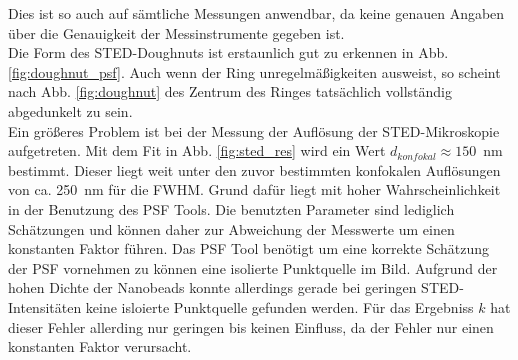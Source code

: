Dies ist so auch auf sämtliche Messungen anwendbar, da keine genauen Angaben über die Genauigkeit der Messinstrumente gegeben ist.
\\
Die Form des STED-Doughnuts ist erstaunlich gut zu erkennen in Abb. \ref{fig:doughnut_psf}. Auch wenn der Ring unregelmäßigkeiten ausweist, so scheint nach Abb. \ref{fig:doughnut} des Zentrum des Ringes tatsächlich vollständig abgedunkelt zu sein.
\\
Ein größeres Problem ist bei der Messung der Auflösung der STED-Mikroskopie aufgetreten. Mit dem Fit in Abb. \ref{fig:sted_res} wird ein Wert $d_{konfokal} \approx 150$~nm bestimmt.
Dieser liegt weit unter den zuvor bestimmten konfokalen Auflösungen von ca. 250~nm für die FWHM.
Grund dafür liegt mit hoher Wahrscheinlichkeit in der Benutzung des PSF Tools.
Die benutzten Parameter sind lediglich Schätzungen und können daher zur Abweichung der Messwerte um einen konstanten Faktor führen.
Das PSF Tool benötigt um eine korrekte Schätzung der PSF vornehmen zu können eine isolierte Punktquelle im Bild.
Aufgrund der hohen Dichte der Nanobeads konnte allerdings gerade bei geringen STED-Intensitäten keine isloierte Punktquelle gefunden werden. 
Für das Ergebniss $k$ hat dieser Fehler allerding nur geringen bis keinen Einfluss, da der Fehler nur einen konstanten Faktor verursacht.

